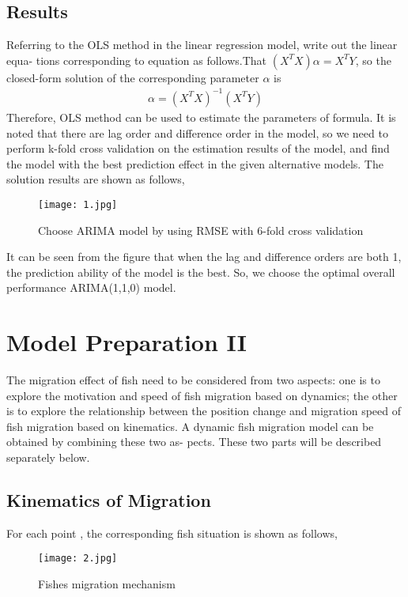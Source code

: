 \documentclass[12pt]{article}  %
\begin{document}
\subsection{Results}
Referring to the OLS method in the linear regression model, write out the linear equa-
tions corresponding to equation as follows.That $(X^{T}X)\alpha = X^{T}Y$, 
so the closed-form solution of the corresponding parameter $ \alpha $ is
\begin{align} %
    \alpha = (X^{T}X)^{-1}(X^{T}Y)
\end{align}
Therefore, OLS method can be used to estimate the parameters of formula. It is noted that
there are lag order and difference order in the model, so we need to perform k-fold cross
validation on the estimation results of the model, and find the model with the best prediction
effect in the given alternative models. The solution results are shown as follows,
\begin{figure}[htbp]  %
    \centering  %
    \texttt{[image: 1.jpg]} %
    \caption{Choose ARIMA model by using RMSE with 6-fold cross validation} %
\end{figure}

It can be seen from the figure that when the lag and difference orders are both 1, the
prediction ability of the model is the best. So, we choose the optimal overall performance
ARIMA(1,1,0) model.

\section{Model Preparation II}
The migration effect of fish need to be considered from two aspects: one is to explore
the motivation and speed of fish migration based on dynamics; the other is to explore the
relationship between the position change and migration speed of fish migration based on
kinematics. A dynamic fish migration model can be obtained by combining these two as-
pects. These two parts will be described separately below.

\subsection{Kinematics of Migration}
For each point , the corresponding fish situation is shown as follows,
\begin{figure}[htbp]  %
    \centering  %
    \texttt{[image: 2.jpg]} %
    \caption{Fishes migration mechanism} %
\end{figure}
\end{document}
